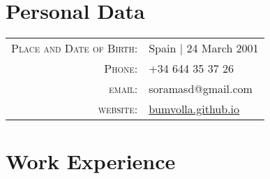 \documentclass[a4paper,10pt]{article} %
\begin{document}
\pagestyle{empty} %


\par{\par} %
\vspace{10pt}
\par{\bigskip\par} %

\section{Personal Data}

\begin{tabular}{rl}
\textsc{Place and Date of Birth:} & Spain  | 24 March 2001 \\
\textsc{Phone:} & +34 644 35 37 26\\
\textsc{email:} & {soramasd@gmail.com}\\
\textsc{website:} & {\href{bumvolla.github.io}{bumvolla.github.io}}
\end{tabular}


\section{Work Experience}
\end{document}
